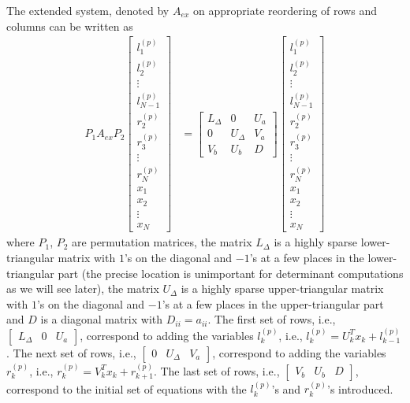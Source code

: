 \documentclass[times]{nlaauth}
\begin{document}
The extended system, denoted by $A_{ex}$ on appropriate reordering of rows and columns can be written as
\begin{align}
P_1A_{ex} P_2
\begin{bmatrix}
l_1^{(p)}\\
l_2^{(p)}\\
\vdots\\
l_{N-1}^{(p)}\\
r_2^{(p)}\\
r_3^{(p)}\\
\vdots\\
r_N^{(p)}\\
x_1\\
x_2\\
\vdots\\
x_N
\end{bmatrix} & =
\begin{bmatrix}
L_{\Delta} & 0 & U_a\\
0 & U_{\Delta} & V_a\\
V_b & U_b & D
\end{bmatrix}
\begin{bmatrix}
l_1^{(p)}\\
l_2^{(p)}\\
\vdots\\
l_{N-1}^{(p)}\\
r_2^{(p)}\\
r_3^{(p)}\\
\vdots\\
r_N^{(p)}\\
x_1\\
x_2\\
\vdots\\
x_N
\end{bmatrix}
\end{align}
where $P_1$, $P_2$ are permutation matrices, the matrix $L_{\Delta}$ is a highly sparse lower-triangular matrix with $1$'s on the diagonal and $-1$'s at a few places in the lower-triangular part (the precise location is unimportant for determinant computations as we will see later), the matrix $U_{\Delta}$ is a highly sparse upper-triangular matrix with $1$'s on the diagonal and $-1$'s at a few places in the upper-triangular part and $D$ is a diagonal matrix with $D_{ii} = a_{ii}$. The first set of rows, i.e., $\begin{bmatrix} L_{\Delta} & 0 & U_a\end{bmatrix}$, correspond to adding the variables $l_k^{(p)}$, i.e., $l_k^{(p)} = U_k^Tx_k + l_{k-1}^{(p)}$. The next set of rows, i.e., $\begin{bmatrix} 0 & U_{\Delta} & V_a\end{bmatrix}$, correspond to adding the variables $r_k^{(p)}$, i.e., $r_k^{(p)} = V_k^Tx_k + r_{k+1}^{(p)}$. The last set of rows, i.e., $\begin{bmatrix} V_b & U_b & D\end{bmatrix}$, correspond to the initial set of equations with the $l_k^{(p)}$'s and $r_k^{(p)}$'s introduced.
\end{document}
